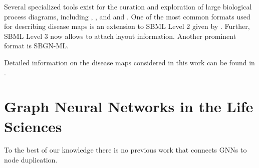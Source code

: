 \documentclass[
	fontsize=10pt, %
	twoside=false, %
	secnumdepth=1, %
  toc=indentunnumbered %
]{kaobook}
\begin{document}




Several specialized tools exist for the curation and exploration of large
biological process diagrams, including 
\cite{funahashi_CellDesignerVersatileModeling_2008}, 
\cite{gawron_MINERVAPlatformVisualization_2016}, 
\cite{kuperstein_NaviCellWebbasedEnvironment_2013} and 
\cite{shannon_cytoscape_2003} and 
\cite{rohn_VANTEDV2Framework_2012}.
%
One of the most common formats used for describing disease maps is an extension to SBML
Level 2 given by . Further, SBML Level 3 now allows to attach
layout information. Another prominent format is SBGN-ML.

Detailed information on the disease maps considered in this work can be found in
.




\section{Graph Neural Networks in the Life Sciences}
\label{sec:gnn-applications}




To the best of our knowledge there is no previous work that connects GNNs to
node duplication.
\end{document}
